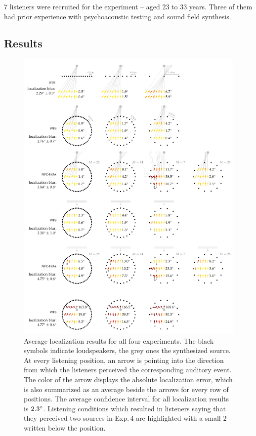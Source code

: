 7 listeners were recruited for the experiment -- aged 23 to 33 years.
Three of them had prior experience with psychoacoustic testing and sound field
synthesis.




\subsection{Results}
\label{sec:localization_results}
%
\begin{figure}
    \centering
    \hspace*{-1.2cm}\includegraphics{fig5_04/fig5_04}
    \caption{Average localization results for all four experiments. The black
    symbols indicate loudspeakers, the grey ones the synthesized source. At
    every listening position, an arrow is pointing into the direction from which the
    listeners perceived the corresponding auditory event. The color of the arrow
    displays the absolute localization error, which is also summarized as an
    average beside the arrows for every row of positions. The average confidence interval for
    all localization results is $2.3^\circ$. Listening conditions which
    resulted in listeners saying that they perceived two sources in Exp.\,4 are
    highlighted with a small $2$ written below the position.
    }
    \label{fig:localization_results}
\end{figure}
